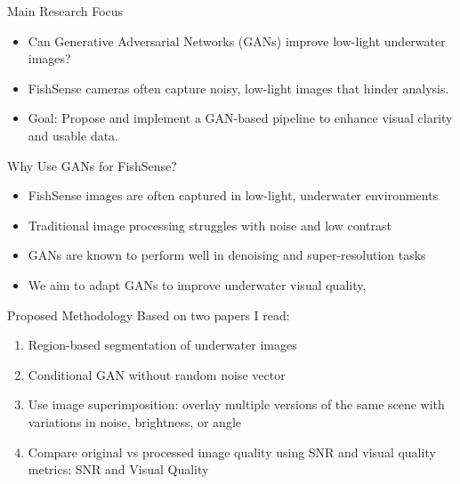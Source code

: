 \begin{frame}{Main Research Focus}
    \begin{itemize}
        \item Can Generative Adversarial Networks (GANs) improve low-light underwater images?
        \item  FishSense cameras often capture noisy, low-light images that hinder analysis.
        \item Goal: Propose and implement a GAN-based pipeline to enhance visual clarity and usable data.
    \end{itemize}
\end{frame}

\begin{frame}{Why Use GANs for FishSense?}
    \begin{itemize}
        \item FishSense images are often captured in low-light, underwater environments
        \item Traditional image processing struggles with noise and low contrast
        \item GANs are known to perform well in denoising and super-resolution tasks
        \item We aim to adapt GANs to improve underwater visual quality,
    \end{itemize}
\end{frame}

\begin{frame}{Proposed Methodology}
Based on two papers I read:
    \begin{enumerate}
        \item Region-based segmentation of underwater images
        \item Conditional GAN without random noise vector
        \item Use image superimposition: overlay multiple versions of the same scene with variations in noise, brightness, or angle
        \item Compare original vs processed image quality using SNR and visual quality metrics: SNR and Visual Quality
    \end{enumerate}
\end{frame}

